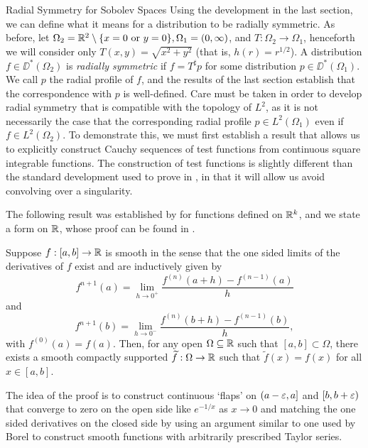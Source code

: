 \begin{chapter}{Radial Symmetry for Sobolev Spaces}
Using the development in the last section, we can define what it means for a distribution to be radially symmetric. 
As before, let $\Omega_2 = \mathbb R^2\setminus \{x =0\text{ or }y=0\},\Omega_1 = (0,\infty)$, and $T:\Omega_2 \to \Omega_1$, henceforth we will consider only $T(x,y) = \sqrt{x^2 + y^2}$ (that is, $h(r) = r^{1/2}$). 
A distribution $f \in \DD^*(\Omega_2)$ is \emph{radially symmetric} if $f = T^\sharp p$ for some distribution $p \in \DD^*(\Omega_1)$.
We call $p$ the radial profile of $f$, and the results of the last section establish that the correspondence with $p$ is well-defined.
Care must be taken in order to develop radial symmetry that is compatible with the topology of $L^2$,
as it is not necessarily the case that the corresponding radial profile $p \in L^2(\Omega_1)$ even if $f \in L^2(\Omega_2)$.
To demonstrate this, we must first establish a result that allows us to explicitly construct Cauchy sequences of test functions from continuous square integrable functions.
The construction of test functions is slightly different than the standard development used to prove  in \citep{hormander1983,richtmyer1978principles}, in that it will allow us avoid convolving over a singularity.%

The following result was established by \citep{seeley1964extension} for functions defined on $\mathbb R^k$, and we state a form on $\mathbb R$, whose proof can be found in \citep{strichartz2000}.
\begin{thm} \label{thm:extension}
  Suppose $f:[a,b]\to \mathbb R$ is smooth in the sense that the one sided limits of the derivatives of $f$ exist and are inductively  given by
  \begin{equation}
    f^{n+1}(a) = \lim_{h\to 0^+} \frac{f^{(n)}(a+h) - f^{(n-1)}(a)}{h} 
  \end{equation}
  and 
  \begin{equation}
    f^{n+1}(b) = \lim_{h\to 0^-} \frac{f^{(n)}(b+h) - f^{(n-1)}(b)}{h}, 
  \end{equation}
  with $f^{(0)}(a) = f(a)$.
  Then, for any open $\Omega \subseteq \mathbb R$ such that $[a,b] \subset \Omega$, there exists a smooth compactly supported $\widetilde f:\Omega \to \mathbb R$ such that $\tilde f(x) = f(x)$ for all $x\in [a,b]$.
\end{thm}
The idea of the proof is to construct continuous `flaps' on $(a-\varepsilon,a]$ and $[b,b+\varepsilon)$ that converge to zero on the open side like $e^{-1/x}$ as $x\to 0$ and matching the one sided derivatives on the closed side by using an argument similar to one used by Borel to construct smooth functions with arbitrarily prescribed Taylor series.


\end{chapter}
